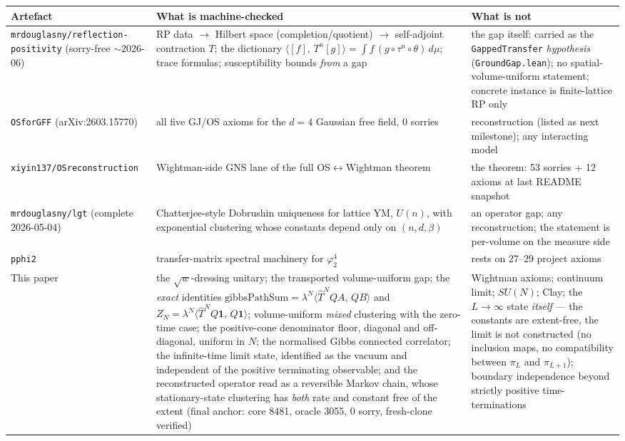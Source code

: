 \documentclass[11pt]{article}
\newcommand{\lean}[1]{\texttt{#1}}
\newcommand{\ip}[2]{\langle #1,\,#2\rangle}
\begin{document}
\begin{center}
\begin{tabular}{p{4.1cm}p{5.2cm}p{4.6cm}}
\textbf{Artefact} & \textbf{What is machine-checked} & \textbf{What is
not} \\ \hline
\lean{mrdouglasny/}\newline\lean{reflection-positivity} (sorry-free
$\sim$2026-06) & RP data $\to$ Hilbert space (completion/quotient)
$\to$ self-adjoint contraction $T$; the dictionary
$\ip{[f]}{T^n[g]} = \int f\,(g\circ\tau^n\circ\theta)\,d\mu$; trace
formulas; susceptibility bounds \emph{from} a gap & the gap itself:
carried as the \lean{GappedTransfer} \emph{hypothesis}
(\lean{GroundGap.lean}); no spatial-volume-uniform statement; concrete
instance is finite-lattice RP only \\
\lean{OSforGFF} (arXiv:2603.15770) & all five GJ/OS axioms for the
$d{=}4$ Gaussian free field, 0 sorries & reconstruction (listed as next
milestone); any interacting model \\
\lean{xiyin137/OSreconstruction} & Wightman-side GNS lane of the full
OS$\leftrightarrow$Wightman theorem & the theorem: 53 sorries + 12
axioms at last README snapshot \\
\lean{mrdouglasny/lgt} (complete 2026-05-04) & Chatterjee-style
Dobrushin uniqueness for lattice YM, $U(n)$, with exponential
clustering whose constants depend only on $(n,d,\beta)$ & an operator
gap; any reconstruction; the statement is per-volume on the measure
side \\
\lean{pphi2} & transfer-matrix spectral machinery for $\varphi^4_2$ &
rests on 27--29 project axioms \\
This paper & the $\sqrt{w}$-dressing unitary; the transported
volume-uniform gap; the \emph{exact} identities
$\mathrm{gibbsPathSum} = \lambda^N\ip{\hat T^N QA}{QB}$ and
$Z_N = \lambda^N\ip{\hat T^N Q\mathbf 1}{Q\mathbf 1}$; volume-uniform
\emph{mixed} clustering with the zero-time case; the positive-cone
denominator floor, diagonal and off-diagonal, uniform in $N$; the
normalised Gibbs connected correlator; the infinite-time limit state,
identified as the vacuum and independent of the positive terminating
observable; and the reconstructed operator read as a reversible Markov
chain, whose stationary-state clustering has \emph{both} rate and
constant free of the extent (final anchor: core 8481, oracle 3055,
0 sorry, fresh-clone verified) & Wightman axioms; continuum limit;
$SU(N)$; Clay; the $L\to\infty$ state \emph{itself} --- the constants
are extent-free, the limit is not constructed (no inclusion maps, no
compatibility between $\pi_L$ and $\pi_{L+1}$); boundary independence
beyond strictly positive time-terminations \\
\end{tabular}
\end{center}
\end{document}
